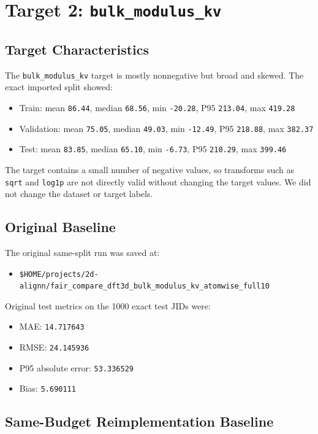 \documentclass[11pt]{article}
\begin{document}
\section{Target 2: \texttt{bulk\_modulus\_kv}}

\subsection{Target Characteristics}

The \texttt{bulk\_modulus\_kv} target is mostly nonnegative but broad and skewed.  The exact imported split showed:
\begin{itemize}
  \item Train: mean \texttt{86.44}, median \texttt{68.56}, min \texttt{-20.28}, P95 \texttt{213.04}, max \texttt{419.28}
  \item Validation: mean \texttt{75.05}, median \texttt{49.03}, min \texttt{-12.49}, P95 \texttt{218.88}, max \texttt{382.37}
  \item Test: mean \texttt{83.85}, median \texttt{65.10}, min \texttt{-6.73}, P95 \texttt{210.29}, max \texttt{399.46}
\end{itemize}

The target contains a small number of negative values, so transforms such as \texttt{sqrt} and \texttt{log1p} are not directly valid without changing the target values.  We did not change the dataset or target labels.

\subsection{Original Baseline}

The original same-split run was saved at:
\begin{itemize}
  \item \texttt{\$HOME/projects/2d-alignn/fair\_compare\_dft3d\_bulk\_modulus\_kv\_atomwise\_full10}
\end{itemize}

Original test metrics on the 1000 exact test JIDs were:
\begin{itemize}
  \item MAE: \texttt{14.717643}
  \item RMSE: \texttt{24.145936}
  \item P95 absolute error: \texttt{53.336529}
  \item Bias: \texttt{5.690111}
\end{itemize}

\subsection{Same-Budget Reimplementation Baseline}
\end{document}
